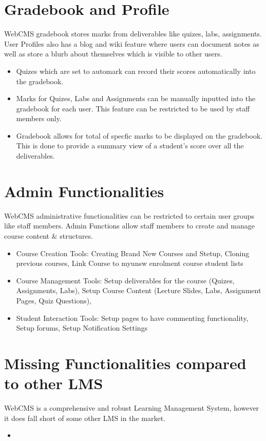 \section{Gradebook and Profile}
WebCMS gradebook stores marks from deliverables like quizes, labs, assignments. User Profiles also has a blog and wiki feature where users can document notes as well as store a blurb about themselves which is visible to other users.
\begin{itemize}
\item Quizes which are set to automark can record their scores automatically into the gradebook.
\item Marks for Quizes, Labs and Assignments can be manually inputted into the gradebook for each user. This feature can be restricted to be used by staff members only.
\item Gradebook allows for total of specfic marks to be displayed on the gradebook. This is done to provide a summary view of a student's score over all the deliverables.
\end{itemize}

\section{Admin Functionalities}
WebCMS administrative functionalities can be restricted to certain user groups like staff members. Admin Functions allow staff members to create and manage course content \& structures.
\begin{itemize}
\item Course Creation Tools: Creating Brand New Courses and Stetup, Cloning previous courses, Link Course to myunsw enrolment course student lists
\item Course Management Tools: Setup deliverables for the course (Quizes, Assignments, Labs), Setup Course Content (Lecture Slides, Labs, Assignment Pages, Quiz Questions), 
\item Student Interaction Tools: Setup pages to have commenting functionality, Setup forums, Setup Notification Settings
\end{itemize}

\section{Missing Functionalities compared to other LMS}
WebCMS is a comprehensive and robust Learning Management System, however it does fall short of some other LMS in the market.
\begin{itemize}
\item 
\end{itemize}